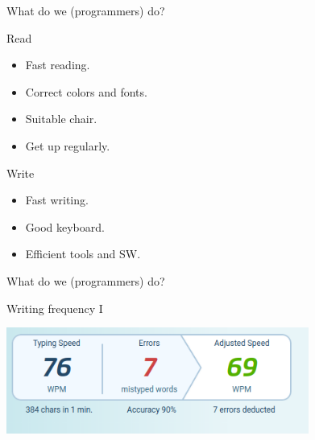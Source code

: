 \begin{frame}{What do we (programmers) do?}
  \begin{block}{Read}
    \begin{itemize}
      \item Fast reading. %
      \item Correct colors and fonts. %
      \item Suitable chair. %
      \item Get up regularly. %
    \end{itemize}
  \end{block}
  \begin{block}{Write}
    \begin{itemize}
      \item Fast writing. %
      \item Good keyboard. %
      \item Efficient tools and SW. %
    \end{itemize}
  \end{block}
\end{frame}

\begin{frame}{What do we (programmers) do?}
  \begin{block}{Writing frequency I}
    \begin{center}
      \includegraphics[height=3.5cm]{img/my-typing-01.png}
    \end{center}
  \end{block}
\end{frame}

